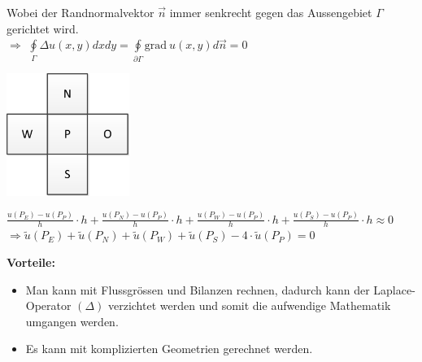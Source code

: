Wobei der Randnormalvektor $\vec{n}$ immer senkrecht gegen das Aussengebiet $\Gamma$ gerichtet wird.\\

$\Rightarrow$ $\oint\limits_{\Gamma}{\Delta u(x,y) dx dy}=\oint\limits_{\partial\Gamma}{\mathrm{grad}~ u(x,y) d\vec{n}}=0$

\begin{minipage}{4cm}
	\includegraphics[width=4cm]{Content/02_numerics/FVMPrinzip.png}
\end{minipage}
\hfill
\begin{minipage}{14cm}
	$\frac{u(P_E)-u(P_P)}{h}\cdot h+\frac{u(P_N)-u(P_P)}{h}\cdot h+\frac{u(P_W)-u(P_P)}{h}\cdot h+\frac{u(P_S)-u(P_P)}{h}\cdot h\approx 0$\\

	$\Rightarrow\tilde{u}(P_E)+\tilde{u}(P_N)+\tilde{u}(P_W)+\tilde{u}(P_S)-4\cdot\tilde{u}(P_P)=0$
\end{minipage}

\textbf{Vorteile:}\\
\begin{itemize}
\item Man kann mit Flussgrössen und Bilanzen rechnen, dadurch kann der
Laplace-Operator $(\Delta)$ verzichtet werden und somit die aufwendige Mathematik umgangen werden.
\item Es kann mit komplizierten Geometrien gerechnet werden.
\end{itemize}

